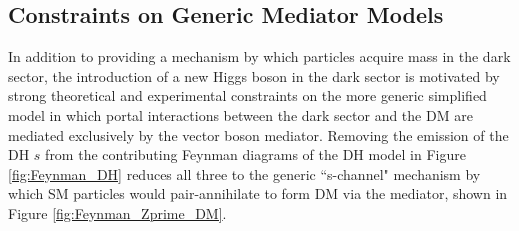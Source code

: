 \subsection{Constraints on Generic \Zprime Mediator Models} 
\label{sec:Zprime_model_constraints}

In addition to providing a mechanism by which particles acquire mass in the dark sector, the introduction of a new Higgs boson in the dark sector is motivated by strong theoretical and experimental constraints \cite{Zprime_portal_gen, Zprime_portal_monojet_dijet} on the more generic simplified model in which portal interactions between the dark sector and the DM are mediated exclusively by the \Zprime vector boson mediator. Removing the emission of the DH \(s\) from the contributing Feynman diagrams of the DH model in Figure \ref{fig:Feynman_DH} reduces all three to the generic ``s-channel" mechanism by which SM particles would pair-annihilate to form DM via the \Zprime mediator, shown in Figure \ref{fig:Feynman_Zprime_DM}. 

